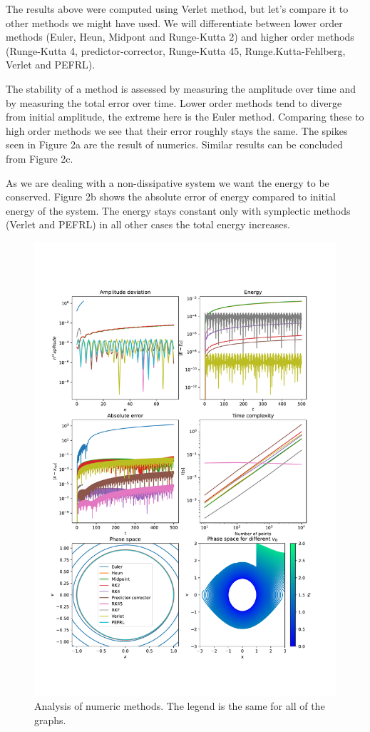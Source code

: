\documentclass[12pt, a4paper]{article}
\begin{document}
The results above were computed using Verlet method, but let's compare it to other methods we might have used. We will differentiate between lower order methods (Euler, Heun, Midpont and Runge-Kutta 2) and higher order methods (Runge-Kutta 4, predictor-corrector, Runge-Kutta 45, Runge.Kutta-Fehlberg, Verlet and PEFRL).

The stability of a method is assessed by measuring the amplitude over time and by measuring the total error over time. Lower order methods tend to diverge from initial amplitude, the extreme here is the Euler method. Comparing these to high order methods we see that their error roughly stays the same. The spikes seen in Figure 2a are the result of numerics. Similar results can be concluded from Figure 2c.

As we are dealing with a non-dissipative system we want the energy to be conserved. Figure 2b shows the absolute error of energy compared to initial energy of the system. The energy stays constant only with symplectic methods (Verlet and PEFRL) in all other cases the total energy increases.

\begin{figure}[hbtp]
  \begin{center}
  \includegraphics[width=14cm]{graphs/method_comparison.pdf}
  \end{center}
  \vspace*{-7mm}
  \caption{Analysis of numeric methods. The legend is the same for all of the graphs.}
\end{figure}
\end{document}
